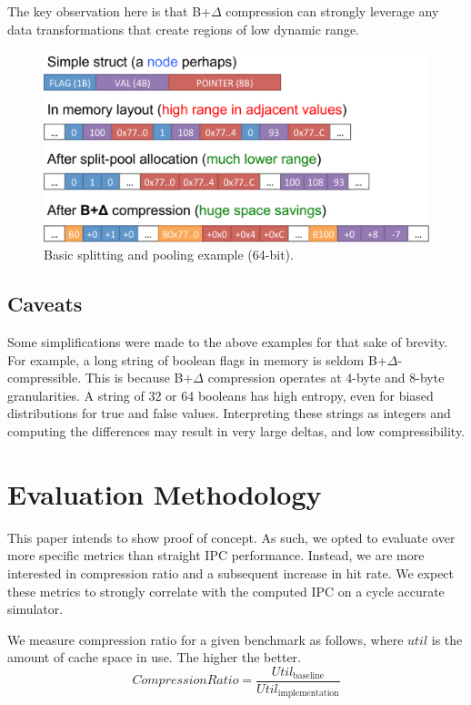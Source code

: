 \documentclass[pageno]{jpaper}
\begin{document}
The key observation here is that B+$\Delta$ compression  can strongly leverage any data transformations that create regions of low dynamic range.

\begin{figure}[bp]
  \captionsetup{justification=raggedright, singlelinecheck=false}
    \caption{Basic splitting and pooling example (64-bit).}
  \centering
    \includegraphics[scale=0.27]{mechanisms.pdf}
\end{figure}

\subsection{Caveats}
Some simplifications were made to the above examples for that sake of brevity. For example, a long string of boolean flags in memory is seldom B+$\Delta$-compressible. This is because B+$\Delta$ compression operates at 4-byte and 8-byte granularities. A string of 32 or 64 booleans has high entropy, even for biased distributions for true and false values. Interpreting these strings as integers and computing the differences may result in very large deltas, and low compressibility.


\section{Evaluation Methodology}
This paper intends to show proof of concept. As such, we opted to evaluate over more specific metrics than straight IPC performance. Instead, we are more interested in compression ratio and a subsequent increase in hit rate. We expect these metrics to strongly correlate with the computed IPC on a cycle accurate simulator.

We measure compression ratio for a given benchmark as follows, where $util$ is the amount of cache space in use. The higher the better.
\[
CompressionRatio = \frac{Util_{\text{baseline}}}{Util_{\text{implementation}}}
\]
\end{document}
